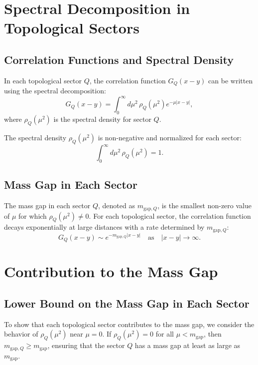 \section{Spectral Decomposition in Topological Sectors}

\subsection{Correlation Functions and Spectral Density}

In each topological sector \(Q\), the correlation function \(G_Q(x - y)\) can be written using the spectral decomposition:
\begin{equation}
G_Q(x - y) = \int_0^\infty d\mu^2 \, \rho_Q(\mu^2) e^{-\mu |x - y|},
\end{equation}
where \(\rho_Q(\mu^2)\) is the spectral density for sector \(Q\).

The spectral density \(\rho_Q(\mu^2)\) is non-negative and normalized for each sector:
\begin{equation}
\int_0^\infty d\mu^2 \, \rho_Q(\mu^2) = 1.
\end{equation}

\subsection{Mass Gap in Each Sector}

The mass gap in each sector \(Q\), denoted as \(m_{\text{gap}, Q}\), is the smallest non-zero value of \(\mu\) for which \(\rho_Q(\mu^2) \neq 0\). For each topological sector, the correlation function decays exponentially at large distances with a rate determined by \(m_{\text{gap}, Q}\):
\begin{equation}
G_Q(x - y) \sim e^{-m_{\text{gap}, Q} |x - y|} \quad \text{as} \quad |x - y| \to \infty.
\end{equation}



\section{Contribution to the Mass Gap}

\subsection{Lower Bound on the Mass Gap in Each Sector}

To show that each topological sector contributes to the mass gap, we consider the behavior of \(\rho_Q(\mu^2)\) near \(\mu = 0\). If \(\rho_Q(\mu^2) = 0\) for all \(\mu < m_{\text{gap}}\), then \(m_{\text{gap}, Q} \geq m_{\text{gap}}\), ensuring that the sector \(Q\) has a mass gap at least as large as \(m_{\text{gap}}\).

